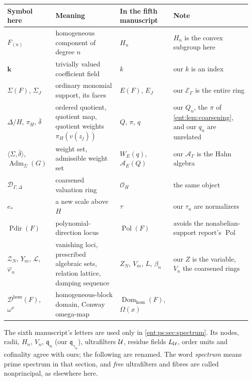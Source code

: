 \documentclass[11pt]{article}
\theoremstyle{plain}
\theoremstyle{plain}
\theoremstyle{plain}
\theoremstyle{definition}
\theoremstyle{definition}
\theoremstyle{definition}
\theoremstyle{definition}
\theoremstyle{remark}
\newcommand{\E}{\mathcal E_\Gamma}
\newcommand{\A}{\mathcal A_\Gamma}\newcommand{\OO}{\mathcal O_\Gamma}
\newcommand{\Dom}{\mathcal D_{\Gamma,\Delta}}
\newcommand{\kk}{\mathbf k}\newcommand{\PP}{\mathbb P}
\DeclareMathOperator{\Pdir}{Pdir}\DeclareMathOperator{\Adm}{Adm}
\newcommand{\inner}[2]{\langle#1,#2\rangle}
\begin{document}
\begin{center}\small
\begin{tabularx}{\textwidth}{@{}P{0.2\textwidth}P{0.3\textwidth}P{0.17\textwidth}Y@{}}
\toprule
Symbol here & Meaning & In the fifth manuscript & Note\\\midrule
$F_{(n)}$ & homogeneous component of degree $n$ & $H_n$ & $H_n$ is the
convex subgroup here\\[0.3em]
$\kk$ & trivially valued coefficient field & $k$ & our $k$ is an
index\\[0.3em]
$\Sigma(F)$, $\Sigma_J$ & ordinary monomial support, its faces & $E(F)$,
$E_J$ & our $\E$ is the entire ring\\[0.3em]
$\Delta/H$, $\pi_H$, $\bar\delta$ & ordered quotient, quotient map,
quotient weights $\pi_H(v(z_j))$ & $Q$, $\pi$, $q$ & our $Q_n$, the $\pi$ of
\cref{ent:lem:coarsening}, and our $q_n$ are unrelated\\[0.3em]
$\inner\Sigma{\bar\delta}$, $\Adm_\Sigma(G)$ & weight set, admissible weight
set & $W_E(q)$, $\mathcal A_E(Q)$ & our $\A$ is the Hahn algebra\\[0.3em]
$\Dom$ & coarsened valuation ring & $\mathcal O_H$ & the same
object\\[0.3em]
$e_*$ & a new scale above $H$ & $\tau$ & our $\tau_n$ are
normalizers\\[0.3em]
$\Pdir(F)$ & polynomial-direction locus & $\operatorname{Pol}(F)$ & avoids
the nonabelian-support report's $\operatorname{Pol}$\\[0.3em]
$\mathcal Z_N$, $Y_m$, $\mathcal L$, $\varphi_n$ & vanishing loci,
prescribed algebraic sets, relation lattice, damping sequence & $Z_N$, $V_m$,
$L$, $\beta_n$ & our $Z$ is the variable, $V_n$ the coarsened rings\\[0.3em]
$\mathcal D^{\mathrm{hom}}(F)$, $\omega^x$ & homogeneous-block domain,
Conway omega-map & $\operatorname{Dom}_{\mathrm{hom}}(F)$, $\Omega(x)$ & \\
\bottomrule
\end{tabularx}
\end{center}

The sixth manuscript's letters are used only in \cref{ent:ps:sec:spectrum}.
Its nodes, radii, $H_n$, $V_n$, $\mathfrak q_n$ (our $\mathfrak
q_{\gamma_n}$), ultrafilters $\mathcal U$, residue fields $L_\mathcal U$, order units
and cofinality agree with ours; the following are renamed. The word
\emph{spectrum} means prime spectrum in that section, and \emph{free}
ultrafilters and fibres are called nonprincipal, as elsewhere here.
\end{document}
